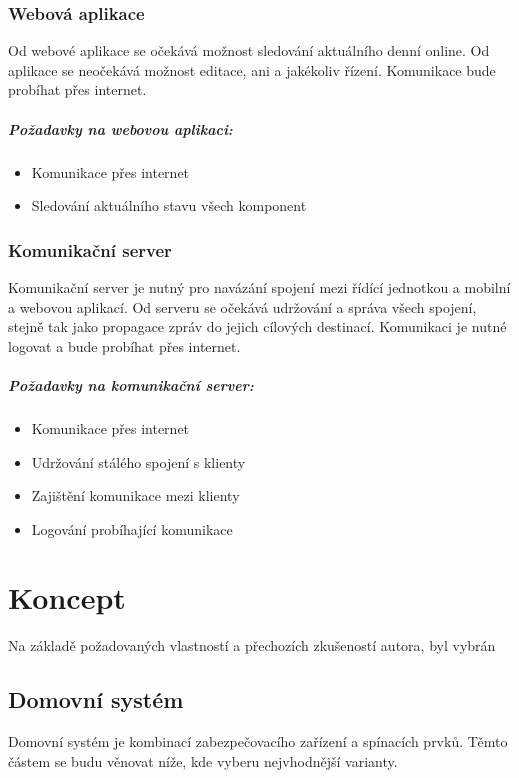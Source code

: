 \documentclass[FM,DP]{tulthesis}  %
\begin{document}
\subsection{Webová aplikace}
Od webové aplikace se očekává možnost sledování aktuálního denní online. Od aplikace se neočekává možnost editace, ani a jakékoliv řízení. Komunikace bude probíhat přes internet.

\paragraph{Požadavky na webovou aplikaci:}
\begin{itemize}
\item Komunikace přes internet
\item Sledování aktuálního stavu všech komponent
\end{itemize}

\subsection{Komunikační server}
Komunikační server je nutný pro navázání spojení mezi řídící jednotkou a mobilní a webovou aplikací. Od serveru se očekává udržování a správa všech spojení, stejně tak jako propagace zpráv do jejich cílových destinací. Komunikaci je nutné logovat a bude probíhat přes internet.

\paragraph{Požadavky na komunikační server:}
\begin{itemize}
\item Komunikace přes internet
\item Udržování stálého spojení s klienty
\item Zajištění komunikace mezi klienty
\item Logování probíhající komunikace
\end{itemize}


\chapter{Koncept}
Na základě požadovaných vlastností a přechozích zkušeností autora, byl vybrán 

\section{Domovní systém}
Domovní systém je kombinací zabezpečovacího zařízení a spínacích prvků. Těmto částem se budu věnovat níže, kde vyberu nejvhodnější varianty.
\end{document}
